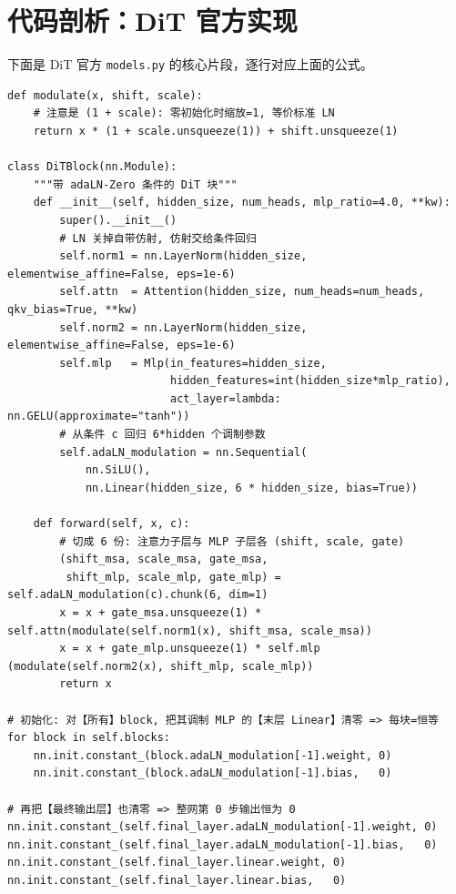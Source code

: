 \documentclass[11pt]{ctexart}
\theoremstyle{definition}
\begin{document}
\section{代码剖析：DiT 官方实现}

下面是 DiT 官方 \texttt{models.py} 的核心片段，逐行对应上面的公式。

\begin{lstlisting}[style=py]
def modulate(x, shift, scale):
    # 注意是 (1 + scale): 零初始化时缩放=1, 等价标准 LN
    return x * (1 + scale.unsqueeze(1)) + shift.unsqueeze(1)

class DiTBlock(nn.Module):
    """带 adaLN-Zero 条件的 DiT 块"""
    def __init__(self, hidden_size, num_heads, mlp_ratio=4.0, **kw):
        super().__init__()
        # LN 关掉自带仿射, 仿射交给条件回归
        self.norm1 = nn.LayerNorm(hidden_size, elementwise_affine=False, eps=1e-6)
        self.attn  = Attention(hidden_size, num_heads=num_heads, qkv_bias=True, **kw)
        self.norm2 = nn.LayerNorm(hidden_size, elementwise_affine=False, eps=1e-6)
        self.mlp   = Mlp(in_features=hidden_size,
                         hidden_features=int(hidden_size*mlp_ratio),
                         act_layer=lambda: nn.GELU(approximate="tanh"))
        # 从条件 c 回归 6*hidden 个调制参数
        self.adaLN_modulation = nn.Sequential(
            nn.SiLU(),
            nn.Linear(hidden_size, 6 * hidden_size, bias=True))

    def forward(self, x, c):
        # 切成 6 份: 注意力子层与 MLP 子层各 (shift, scale, gate)
        (shift_msa, scale_msa, gate_msa,
         shift_mlp, scale_mlp, gate_mlp) = self.adaLN_modulation(c).chunk(6, dim=1)
        x = x + gate_msa.unsqueeze(1) * self.attn(modulate(self.norm1(x), shift_msa, scale_msa))
        x = x + gate_mlp.unsqueeze(1) * self.mlp (modulate(self.norm2(x), shift_mlp, scale_mlp))
        return x

# 初始化: 对【所有】block, 把其调制 MLP 的【末层 Linear】清零 => 每块=恒等
for block in self.blocks:
    nn.init.constant_(block.adaLN_modulation[-1].weight, 0)
    nn.init.constant_(block.adaLN_modulation[-1].bias,   0)

# 再把【最终输出层】也清零 => 整网第 0 步输出恒为 0
nn.init.constant_(self.final_layer.adaLN_modulation[-1].weight, 0)
nn.init.constant_(self.final_layer.adaLN_modulation[-1].bias,   0)
nn.init.constant_(self.final_layer.linear.weight, 0)
nn.init.constant_(self.final_layer.linear.bias,   0)
\end{lstlisting}
\end{document}
